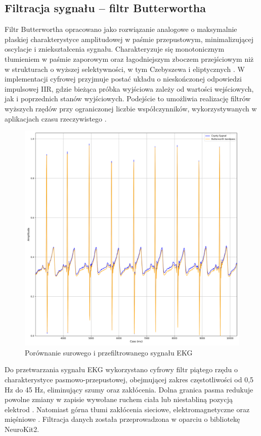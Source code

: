 \documentclass[journal]{IEEEtran}
\begin{document}
{\subsection{Filtracja sygnału – filtr Butterwortha}
Filtr Butterwortha opracowano jako rozwiązanie analogowe o maksymalnie płaskiej charakterystyce amplitudowej w paśmie przepustowym, minimalizującej oscylacje i zniekształcenia sygnału. Charakteryzuje się monotonicznym tłumieniem w paśmie zaporowym oraz łagodniejszym zboczem przejściowym niż w strukturach o wyższej selektywności, w tym Czebyszewa i eliptycznych \cite{22}. W implementacji cyfrowej przyjmuje postać układu o nieskończonej odpowiedzi impulsowej IIR, gdzie bieżąca próbka wyjściowa zależy od wartości wejściowych, jak i poprzednich stanów wyjściowych. Podejście to umożliwia realizację filtrów wyższych rzędów przy ograniczonej liczbie współczynników, wykorzystywanych w aplikacjach czasu rzeczywistego \cite{23}.

\begin{figure}[htbp]
    \centering
    \includegraphics[width=0.76\linewidth]{Filtr_EKG.png} 
    \caption{Porównanie surowego i przefiltrowanego sygnału EKG}
    \label{fig:filtr_ekg}
\end{figure}

Do przetwarzania sygnału EKG wykorzystano cyfrowy filtr piątego rzędu o charakterystyce pasmowo-przepustowej, obejmującej zakres częstotliwości od 0,5 Hz do 45 Hz, eliminujący szumy oraz zakłócenia. Dolna granica pasma redukuje powolne zmiany w zapisie wywołane ruchem ciała lub niestabliną pozycją elektrod  \cite{24}. Natomiast górna tłumi zakłócenia sieciowe, elektromagnetyczne oraz mięśniowe  \cite{25}. Filtracja danych została przeprowadzona w oparciu o bibliotekę NeuroKit2.


}
\end{document}
